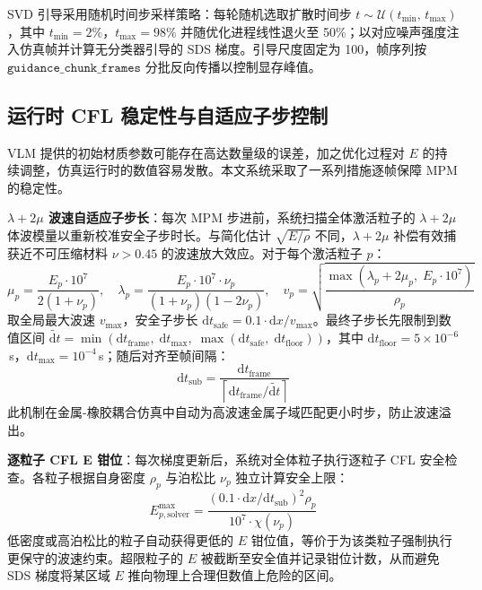 SVD 引导采用随机时间步采样策略：每轮随机选取扩散时间步 $t\sim\mathcal{U}(t_{\min},\,t_{\max})$，其中 $t_{\min}=2\%$，$t_{\max}=98\%$ 并随优化进程线性退火至 50\%；以对应噪声强度注入仿真帧并计算无分类器引导的 SDS 梯度。引导尺度固定为 100，帧序列按 $\texttt{guidance\_chunk\_frames}$ 分批反向传播以控制显存峰值。

\subsection{运行时 CFL 稳定性与自适应子步控制}
VLM 提供的初始材质参数可能存在高达数量级的误差，加之优化过程对 $E$ 的持续调整，仿真运行时的数值容易发散。本文系统采取了一系列措施逐帧保障 MPM 的稳定性。

\textbf{$\lambda+2\mu$ 波速自适应子步长}：每次 MPM 步进前，系统扫描全体激活粒子的 $\lambda+2\mu$ 体波模量以重新校准安全子步时长。与简化估计 $\sqrt{E/\rho}$ 不同，$\lambda+2\mu$ 补偿有效捕获近不可压缩材料 $\nu>0.45$ 的波速放大效应。对于每个激活粒子 $p$：
\begin{equation}
\mu_p=\dfrac{E_p\cdot10^7}{2(1+\nu_p)},\quad\lambda_p=\dfrac{E_p\cdot10^7\cdot\nu_p}{(1+\nu_p)(1-2\nu_p)},\quad v_p=\sqrt{\dfrac{\max(\lambda_p+2\mu_p,\;E_p\cdot10^7)}{\rho_p}}
\end{equation}
取全局最大波速 $v_{\max}$，安全子步长 $\mathrm{d}t_{\text{safe}}=0.1\cdot\mathrm{d}x/v_{\max}$。最终子步长先限制到数值区间 $\widetilde{\mathrm{d}t}=\min\!\left(\mathrm{d}t_{\text{frame}},\;\mathrm{d}t_{\max},\;\max(\mathrm{d}t_{\text{safe}},\;\mathrm{d}t_{\text{floor}})\right)$，其中 $\mathrm{d}t_{\text{floor}}=5\times10^{-6}$\,s，$\mathrm{d}t_{\max}=10^{-4}$\,s；随后对齐至帧间隔：
\begin{equation}
\mathrm{d}t_{\text{sub}}=\frac{\mathrm{d}t_{\text{frame}}}{\left\lceil\mathrm{d}t_{\text{frame}}/\widetilde{\mathrm{d}t}\right\rceil}
\end{equation}
此机制在金属-橡胶耦合仿真中自动为高波速金属子域匹配更小时步，防止波速溢出。

\textbf{逐粒子 CFL E 钳位}：每次梯度更新后，系统对全体粒子执行逐粒子 CFL 安全检查。各粒子根据自身密度 $\rho_p$ 与泊松比 $\nu_p$ 独立计算安全上限：
\begin{equation}
E_{p,\text{solver}}^{\max}=\dfrac{(0.1\cdot\mathrm{d}x/\mathrm{d}t_{\text{sub}})^2\rho_p}{10^7\cdot\chi(\nu_p)}
\end{equation}
低密度或高泊松比的粒子自动获得更低的 $E$ 钳位值，等价于为该类粒子强制执行更保守的波速约束。超限粒子的 $E$ 被截断至安全值并记录钳位计数，从而避免 SDS 梯度将某区域 $E$ 推向物理上合理但数值上危险的区间。

